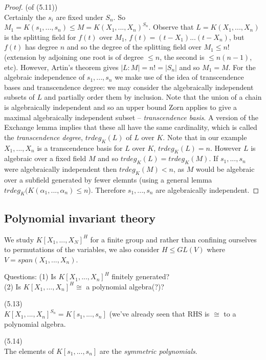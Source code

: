 \documentclass[a4paper]{article}
\begin{document}
\begin{proof} (of (5.11))\\
Certainly the $s_i$ are fixed under $S_n$. So $M_1 = K(s_1,...,s_n) \leq M = K(X_1,...,X_n)^{S_n}$. Observe that $L=K(X_1,...,X_n)$ is the splitting field for $f(t)$ over $M_1$, $f(t) = (t-X_1)...(t-X_n)$, but $f(t)$ has degree $n$ and so the degree of the splitting field over $M_1 \leq n!$ (extension by adjoining one root is of degree $\leq n$, the second is $\leq n(n-1)$, etc). However, Artin's theorem gives $|L:M|=n!=|S_n|$ and so $M_1 = M$. For the algebraic independence of $s_1,...,s_n$ we make use of the idea of transcendence bases and transcendence degree: we may consider the algebraically independent subsets of $L$ and partially order them by inclusion. Note that the union of a chain is algebraically independent and so an upper bound Zorn applies to give a maximal algebraically independent subset -- \emph{transcendence basis}. A version of the Exchange lemma implies that these all have the same cardinality, which is called the \emph{transcendence degree}, $trdeg_K(L)$ of $L$ over $K$. Note that in our example $X_1,...,X_n$ is a transcendence basis for $L$ over $K$, $trdeg_K(L) = n$. However $L$ is algebraic over a fixed field $M$ and so $trdeg_K(L) = trdeg_K(M)$. If $s_1,...,s_n$ were algebraically independent then $trdeg_K(M) < n$, as $M$ would be algebraic over a subfield generated by fewer elemnts (using a general lemma $trdeg_K(K(\alpha_1,...,\alpha_n) \leq n$). Therefore $s_1,...,s_n$ are algebraically independent.
\end{proof}

\subsection{Polynomial invariant theory}
We study $K[X_1,...,X_N]^H$ for a finite group and rather than confining ourselves to permutations of the variables, we also consider $H \leq GL(V)$ where $V = span(X_1,...,X_n)$. 

Questions: (1) Is $K[X_1,...,X_n]^H$ finitely generated?\\
(2) Is $K[X_1,...,X_n]^H \cong$ a polynomial algebra(?)?

\begin{thm} (5.13)\\
$K[X_1,...,X_n]^{S_n} = K[s_1,...,s_n]$ (we've already seen that RHS is $\cong$ to a polynomial algebra.
\end{thm}

\begin{defi} (5.14)\\
The elements of $K[s_1,...,s_n]$ are the \emph{symmetric polynomials}.
\end{defi}
\end{document}
